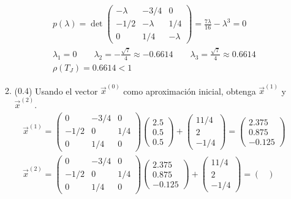 \documentclass[12pt]{article}
\begin{document}
\begin{enumerate}[leftmargin=*,widest=9]
\begin{enumerate}[label=\alph*]
\begin{eqnarray*}
p(\lambda) = \det \begin{pmatrix}
    -\lambda & -3/4 & 0 \\ -1/2 & -\lambda & 1/4\\ 0 & 1/4 & -\lambda
\end{pmatrix} = \frac{7\lambda}{16}- \lambda^3 =0\\
\lambda_1 = 0 \qquad \lambda_2 = -\frac{\sqrt{7}}{4} \approx -0.6614 \qquad \lambda_3 =\frac{\sqrt{7}}{4} \approx 0.6614\\
\rho(T_J) = 0.6614 < 1
\end{eqnarray*}
   \item (\(0.4\)) Usando el vector \(\vec{x}^{(0)}\) como aproximación inicial, obtenga \(\vec{x}^{(1)}\) y \(\vec{x}^{(2)}\).
   \begin{eqnarray*}
   \vec{x}^{(1)} = \begin{pmatrix}
    0 & -3/4 & 0 \\ -1/2 & 0 & 1/4\\ 0 & 1/4 & 0
    \end{pmatrix} \begin{pmatrix}
    2.5 \\ 0.5\\ 0.5
    \end{pmatrix} + \begin{pmatrix}
    11/4 \\ 2\\ -1/4
    \end{pmatrix} = \begin{pmatrix}
    2.375 \\ 0.875\\ -0.125
    \end{pmatrix} \\
    \vec{x}^{(2)} = \begin{pmatrix}
    0 & -3/4 & 0 \\ -1/2 & 0 & 1/4\\ 0 & 1/4 & 0
    \end{pmatrix} \begin{pmatrix}
    2.375 \\ 0.875\\ -0.125
    \end{pmatrix} + \begin{pmatrix}
    11/4 \\ 2\\ -1/4
    \end{pmatrix} = \begin{pmatrix}

\end{pmatrix}
\end{eqnarray*}
\end{enumerate}
\end{enumerate}
\end{document}
